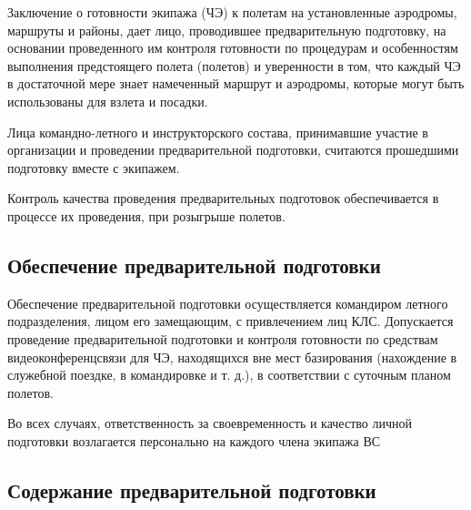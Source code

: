 Заключение о готовности экипажа (ЧЭ) к полетам на установленные аэродромы, маршруты и районы, дает лицо, проводившее предварительную подготовку, на основании проведенного им контроля готовности по процедурам и особенностям выполнения предстоящего полета (полетов) и уверенности в том, что каждый ЧЭ в достаточной мере знает намеченный маршрут и аэродромы, которые могут быть использованы для взлета и посадки.

Лица командно-летного и инструкторского состава, принимавшие участие в организации и проведении предварительной подготовки, считаются прошедшими подготовку вместе с экипажем.

Контроль качества проведения предварительных подготовок обеспечивается в процессе их проведения, при розыгрыше полетов.

\subsection{Обеспечение предварительной подготовки}
\setcounter{subsect}{1}

Обеспечение предварительной подготовки осуществляется командиром летного подразделения, лицом его замещающим, с привлечением лиц КЛС.
Допускается проведение предварительной подготовки и контроля готовности по средствам видеоконференцсвязи для ЧЭ, находящихся вне мест базирования (нахождение в служебной поездке, в командировке и т. д.), в соответствии с суточным планом полетов.

Во всех случаях, ответственность за своевременность и качество личной подготовки возлагается персонально на каждого члена экипажа ВС

\subsection{Содержание предварительной подготовки}
\setcounter{subsect}{1}


